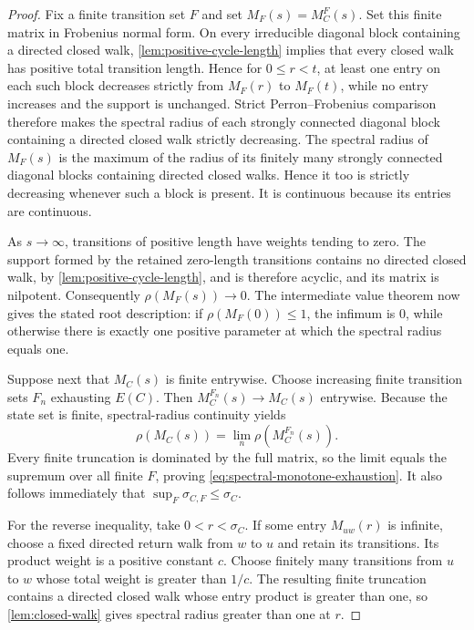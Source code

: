 \documentclass[11pt]{article}
\theoremstyle{definition}
\begin{document}
\begin{proof}
Fix a finite transition set $F$ and set $M_F(s)=M_C^F(s)$.  Set this finite matrix in
Frobenius normal form.  On every irreducible diagonal block containing a directed closed
walk, \cref{lem:positive-cycle-length} implies that every closed walk has positive total transition length.  Hence for $0\le r<t$, at least one entry on each such block decreases strictly from
$M_F(r)$ to $M_F(t)$, while no entry increases and the support is unchanged.  Strict
Perron--Frobenius comparison therefore makes the spectral radius of each strongly connected diagonal block containing a directed closed walk strictly
decreasing.  The spectral radius of $M_F(s)$ is the maximum of the radius of its finitely many
strongly connected diagonal blocks containing directed closed walks.  Hence it too is strictly
decreasing whenever such a block is present.
It is continuous because its entries are continuous.

As $s\to\infty$, transitions of positive length have weights tending to zero.  The
support formed by the retained zero-length transitions contains no directed closed walk, by
\cref{lem:positive-cycle-length}, and is therefore acyclic, and its matrix is nilpotent.  Consequently
$\rho(M_F(s))\to0$.  The intermediate value theorem now gives the stated root description:
if $\rho(M_F(0))\le1$, the infimum is $0$, while otherwise there is exactly one positive
parameter at which the spectral radius equals one.

Suppose next that $M_C(s)$ is finite entrywise.  Choose increasing finite transition sets
$F_n$ exhausting $E(C)$.  Then $M_C^{F_n}(s)\to M_C(s)$ entrywise.  Because the state set
is finite, spectral-radius continuity yields
\[
 \rho(M_C(s))=\lim_n\rho(M_C^{F_n}(s)).
\]
Every finite truncation is dominated by the full matrix, so the limit equals the supremum over
all finite $F$, proving \eqref{eq:spectral-monotone-exhaustion}.  It also follows immediately
that $\sup_F\sigma_{C,F}\le\sigma_C$.

For the reverse inequality, take $0<r<\sigma_C$.  If some entry $M_{uw}(r)$ is infinite,
choose a fixed directed return walk from $w$ to $u$ and retain its transitions.  Its product
weight is a positive constant $c$.  Choose finitely many transitions from $u$ to $w$ whose
total weight is greater than $1/c$.  The resulting finite truncation contains a directed closed
walk whose entry product is greater than one, so \cref{lem:closed-walk} gives spectral radius
greater than one at $r$.


\end{proof}
\end{document}
